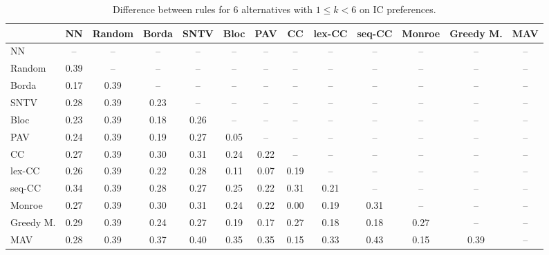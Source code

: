 
\begin{table*}[htbp]
\centering
\begin{tabular}{lcccccccccccc}
\toprule
 & NN & Random & Borda & SNTV & Bloc & PAV & CC & lex-CC & seq-CC & Monroe & Greedy M. & MAV \\
\midrule
NN & -- & -- & -- & -- & -- & -- & -- & -- & -- & -- & -- & -- \\
Random & \cellcolor{blue!39} 0.39 & -- & -- & -- & -- & -- & -- & -- & -- & -- & -- & -- \\
Borda & \cellcolor{blue!17} 0.17 & \cellcolor{blue!39} 0.39 & -- & -- & -- & -- & -- & -- & -- & -- & -- & -- \\
SNTV & \cellcolor{blue!28} 0.28 & \cellcolor{blue!39} 0.39 & \cellcolor{blue!23} 0.23 & -- & -- & -- & -- & -- & -- & -- & -- & -- \\
Bloc & \cellcolor{blue!23} 0.23 & \cellcolor{blue!39} 0.39 & \cellcolor{blue!18} 0.18 & \cellcolor{blue!26} 0.26 & -- & -- & -- & -- & -- & -- & -- & -- \\
PAV & \cellcolor{blue!24} 0.24 & \cellcolor{blue!39} 0.39 & \cellcolor{blue!19} 0.19 & \cellcolor{blue!27} 0.27 & \cellcolor{blue!5} 0.05 & -- & -- & -- & -- & -- & -- & -- \\
CC & \cellcolor{blue!27} 0.27 & \cellcolor{blue!39} 0.39 & \cellcolor{blue!30} 0.30 & \cellcolor{blue!31} 0.31 & \cellcolor{blue!24} 0.24 & \cellcolor{blue!22} 0.22 & -- & -- & -- & -- & -- & -- \\
lex-CC & \cellcolor{blue!26} 0.26 & \cellcolor{blue!39} 0.39 & \cellcolor{blue!22} 0.22 & \cellcolor{blue!28} 0.28 & \cellcolor{blue!11} 0.11 & \cellcolor{blue!7} 0.07 & \cellcolor{blue!19} 0.19 & -- & -- & -- & -- & -- \\
seq-CC & \cellcolor{blue!34} 0.34 & \cellcolor{blue!39} 0.39 & \cellcolor{blue!28} 0.28 & \cellcolor{blue!27} 0.27 & \cellcolor{blue!25} 0.25 & \cellcolor{blue!22} 0.22 & \cellcolor{blue!31} 0.31 & \cellcolor{blue!21} 0.21 & -- & -- & -- & -- \\
Monroe & \cellcolor{blue!27} 0.27 & \cellcolor{blue!39} 0.39 & \cellcolor{blue!30} 0.30 & \cellcolor{blue!31} 0.31 & \cellcolor{blue!24} 0.24 & \cellcolor{blue!22} 0.22 & \cellcolor{blue!0} 0.00 & \cellcolor{blue!19} 0.19 & \cellcolor{blue!31} 0.31 & -- & -- & -- \\
Greedy M. & \cellcolor{blue!28} 0.29 & \cellcolor{blue!39} 0.39 & \cellcolor{blue!24} 0.24 & \cellcolor{blue!27} 0.27 & \cellcolor{blue!19} 0.19 & \cellcolor{blue!17} 0.17 & \cellcolor{blue!27} 0.27 & \cellcolor{blue!18} 0.18 & \cellcolor{blue!18} 0.18 & \cellcolor{blue!27} 0.27 & -- & -- \\
MAV & \cellcolor{blue!28} 0.28 & \cellcolor{blue!39} 0.39 & \cellcolor{blue!37} 0.37 & \cellcolor{blue!40} 0.40 & \cellcolor{blue!35} 0.35 & \cellcolor{blue!35} 0.35 & \cellcolor{blue!15} 0.15 & \cellcolor{blue!33} 0.33 & \cellcolor{blue!43} 0.43 & \cellcolor{blue!15} 0.15 & \cellcolor{blue!39} 0.39 & -- \\
\bottomrule
\end{tabular}

\caption{Difference between rules for 6 alternatives with $1 \leq k < 6$ on IC preferences.}
\label{tab:rule_distance_heatmap-m=[6]-pref_dist=IC}
\end{table*}
    